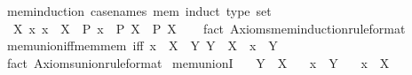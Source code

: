 \begin{isabellebody}
\isanewline
%
\endisadelimproof
\isanewline
{}\isamarkupfalse%
\ mem{\isacharunderscore}{\kern0pt}induction\ {\isacharbrackleft}{\kern0pt}case{\isacharunderscore}{\kern0pt}names\ mem{\isacharcomma}{\kern0pt}\ induct\ type{\isacharcolon}{\kern0pt}\ set{\isacharbrackright}{\kern0pt}{\isacharcolon}{\kern0pt}\isanewline
\ \ {\isachardoublequoteopen}{\isacharparenleft}{\kern0pt}{\isasymAnd}X{\isachardot}{\kern0pt}\ {\isacharparenleft}{\kern0pt}{\isasymAnd}x{\isachardot}{\kern0pt}\ x\ {\isasymin}\ X\ {\isasymLongrightarrow}\ P\ x{\isacharparenright}{\kern0pt}\ {\isasymLongrightarrow}\ P\ X{\isacharparenright}{\kern0pt}\ {\isasymLongrightarrow}\ P\ X{\isachardoublequoteclose}\isanewline
%
\isadelimproof
\ \ %
\endisadelimproof
%
\isatagproof
{}\isamarkupfalse%
\ {\isacharparenleft}{\kern0pt}fact\ Axioms{\isachardot}{\kern0pt}mem{\isacharunderscore}{\kern0pt}induction{\isacharbrackleft}{\kern0pt}rule{\isacharunderscore}{\kern0pt}format{\isacharbrackright}{\kern0pt}{\isacharparenright}{\kern0pt}%
\endisatagproof
{\isafoldproof}%
%
\isadelimproof
\isanewline
%
\endisadelimproof
\isanewline
{}\isamarkupfalse%
\ mem{\isacharunderscore}{\kern0pt}union{\isacharunderscore}{\kern0pt}iff{\isacharunderscore}{\kern0pt}mem{\isacharunderscore}{\kern0pt}mem\ {\isacharbrackleft}{\kern0pt}iff{\isacharbrackright}{\kern0pt}{\isacharcolon}{\kern0pt}\ {\isachardoublequoteopen}{\isacharparenleft}{\kern0pt}x\ {\isasymin}\ {\isasymUnion}X{\isacharparenright}{\kern0pt}\ {\isasymlongleftrightarrow}\ {\isacharparenleft}{\kern0pt}{\isasymexists}Y{\isachardot}{\kern0pt}\ Y\ {\isasymin}\ X\ {\isasymand}\ x\ {\isasymin}\ Y{\isacharparenright}{\kern0pt}{\isachardoublequoteclose}\isanewline
%
\isadelimproof
\ \ %
\endisadelimproof
%
\isatagproof
{}\isamarkupfalse%
\ {\isacharparenleft}{\kern0pt}fact\ Axioms{\isachardot}{\kern0pt}union{\isacharbrackleft}{\kern0pt}rule{\isacharunderscore}{\kern0pt}format{\isacharbrackright}{\kern0pt}{\isacharparenright}{\kern0pt}%
\endisatagproof
{\isafoldproof}%
%
\isadelimproof
\isanewline
%
\endisadelimproof
\isanewline
{}\isamarkupfalse%
\ mem{\isacharunderscore}{\kern0pt}unionI{\isacharcolon}{\kern0pt}\isanewline
\ \ \ {\isachardoublequoteopen}Y\ {\isasymin}\ X{\isachardoublequoteclose}\isanewline
\ \ \ {\isachardoublequoteopen}x\ {\isasymin}\ Y{\isachardoublequoteclose}\isanewline
\ \ \ {\isachardoublequoteopen}x\ {\isasymin}\ {\isasymUnion}X{\isachardoublequoteclose}\isanewline
%
\isadelimproof
\ \ %
\endisadelimproof
%
\isatagproof

\end{isabellebody}
